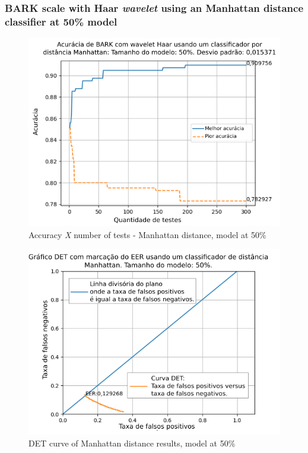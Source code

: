 		\subsubsection{BARK scale with Haar \textit{wavelet} using an Manhattan distance classifier at 50\% model}
			
			
			
			\begin{figure}[ht]
				\centering
				\includegraphics[width=\linewidth]{images/results/confusionMatrices/classifier_Manhattan_50.png}
				\caption{Accuracy \textit{X} number of tests - Manhattan distance, model at 50\%}
				\label{fig:classifiermanhattan50}
			\end{figure}
			
			\begin{figure}[!ht]
				\centering
				\includegraphics[width=.9\linewidth]{images/results/det/DET_for_classifier_Manhattan_50}
				\caption{DET curve of Manhattan distance results, model at 50\%}
				\label{fig:detforclassifiermanhattan50}
			\end{figure}
		
